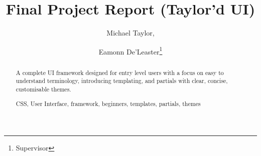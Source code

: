 \documentclass[runningheads,a4paper]{llncs}
\newcommand{\keywords}[1]{\par\addvspace\baselineskip
\noindent\keywordname\enspace\ignorespaces#1}
\begin{document}
\mainmatter  %

\title{Final Project Report (Taylor'd UI)}


%
%
\author{Michael Taylor,%
\and Eamonn De'Leaster\thanks{Supervisor}}
%


%
%
\maketitle

%
\begin{abstract}

A complete UI framework designed for entry level users with a focus on easy to understand terminology, introducing templating, and partials with clear, concise, customisable themes.
\keywords{CSS, User Interface, framework, beginners, templates, partials, themes}
\end{abstract}
%

%
%
%
\newpage
\tableofcontents
%
\renewcommand*{\glsclearpage}{}
\end{document}
